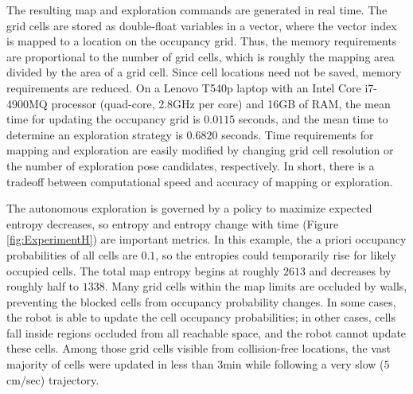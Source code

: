 \documentclass[smallextended]{svjour3}       %
\begin{document}
The resulting map and exploration commands are generated in real time. The grid cells are stored as double-float variables in a vector, where the vector index is mapped to a location on the occupancy grid. Thus, the memory requirements are proportional to the number of grid cells, which is roughly the mapping area divided by the area of a grid cell. Since cell locations need not be saved, memory requirements are reduced. On a Lenovo T540p laptop with an Intel Core i7-4900MQ processor (quad-core, 2.8GHz per core) and 16GB of RAM, the mean time for updating the occupancy grid is $0.0115$ seconds, and the mean time to determine an exploration strategy is $0.6820$ seconds. Time requirements for mapping and exploration are easily modified by changing grid cell resolution or the number of exploration pose candidates, respectively. In short, there is a tradeoff between computational speed and accuracy of mapping or exploration.

The autonomous exploration is governed by a policy to maximize expected entropy decreases, so entropy and entropy change with time (Figure \ref{fig:ExperimentH}) are important metrics. In this example, the a priori occupancy probabilities of all cells are $0.1$, so the entropies could temporarily rise for likely occupied cells. The total map entropy begins at roughly $2613$ and decreases by roughly half to $1338$. Many grid cells within the map limits are occluded by walls, preventing the blocked cells from occupancy probability changes. In some cases, the robot is able to update the cell occupancy probabilities; in other cases, cells fall inside regions occluded from all reachable space, and the robot cannot update these cells. Among those grid cells visible from collision-free locations, the vast majority of cells were updated in less than $3$min while following a very slow ($5$cm/sec) trajectory.
\end{document}
